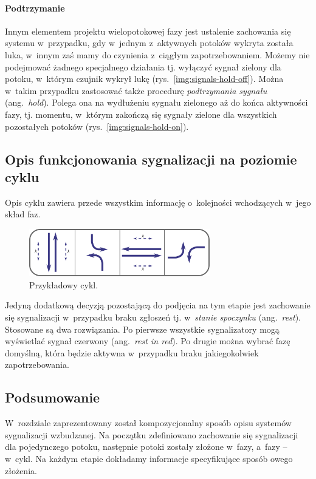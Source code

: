 \documentclass{pracamgr}
\newcommand{\ang}[1]{(ang.~\emph{#1})}
\newcommand{\imgr}[1]{rys.~\ref{#1}}
\theoremstyle{plain}
\begin{document}
\paragraph{Podtrzymanie} Innym elementem projektu wielopotokowej fazy
jest ustalenie zachowania się systemu w~przypadku, gdy w~jednym
z~aktywnych potoków wykryta została luka, w~innym zaś mamy do
czynienia z~ciągłym zapotrzebowaniem. Możemy nie podejmować żadnego
specjalnego działania tj. wyłączyć sygnał zielony dla potoku, w~którym
czujnik wykrył lukę (\imgr{img:signals-hold-off}). Można w~takim
przypadku zastosować także procedurę \emph{podtrzymania sygnału}
\ang{hold}. Polega ona na wydłużeniu sygnału zielonego aż do końca
aktywności fazy, tj. momentu, w~którym zakończą się sygnały zielone
dla wszystkich pozostałych potoków (\imgr{img:signals-hold-on}).

\subsection{Opis funkcjonowania sygnalizacji na poziomie cyklu}
Opis cyklu zawiera przede wszystkim informację o~kolejności
wchodzących w~jego skład faz.
\begin{figure} \centering
  \includegraphics[width=0.7\textwidth]{img/signals-cycle-example}
  \caption{Przykładowy cykl.}
\end{figure}
Jedyną dodatkową decyzją pozostającą do podjęcia na tym etapie jest
zachowanie się sygnalizacji w~przypadku braku zgłoszeń tj.
w~\emph{stanie spoczynku} \ang{rest}. Stosowane są dwa rozwiązania. Po
pierwsze wszystkie sygnalizatory mogą wyświetlać sygnał czerwony
\ang{rest in red}. Po drugie można wybrać fazę domyślną, która będzie
aktywna w~przypadku braku jakiegokolwiek zapotrzebowania.

\subsection{Podsumowanie}

W~rozdziale zaprezentowany został kompozycjonalny sposób opisu
systemów sygnalizacji wzbudzanej. Na początku zdefiniowano zachowanie
się sygnalizacji dla pojedynczego potoku, następnie potoki zostały
złożone w~fazy, a~fazy -- w~cykl. Na każdym etapie dokładamy
informacje specyfikujące sposób owego złożenia.
\end{document}
